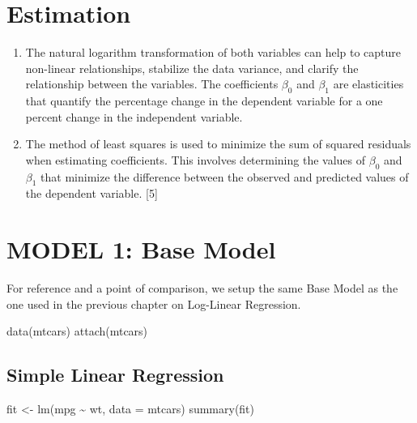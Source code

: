 \documentclass[
  letterpaper,
  DIV=11,
  numbers=noendperiod]{scrreport}
\newenvironment{Shaded}{\begin{snugshade}}{\end{snugshade}}
\newcommand{\AttributeTok}[1]{\textcolor[rgb]{0.40,0.45,0.13}{#1}}
\newcommand{\FunctionTok}[1]{\textcolor[rgb]{0.28,0.35,0.67}{#1}}
\newcommand{\NormalTok}[1]{\textcolor[rgb]{0.00,0.23,0.31}{#1}}
\newcommand{\OtherTok}[1]{\textcolor[rgb]{0.00,0.23,0.31}{#1}}
\newcommand{\SpecialCharTok}[1]{\textcolor[rgb]{0.37,0.37,0.37}{#1}}
\begin{document}
\section{Estimation}\label{estimation}

\begin{enumerate}
\def\labelenumi{\arabic{enumi}.}
\item
  The natural logarithm transformation of both variables can help to
  capture non-linear relationships, stabilize the data variance, and
  clarify the relationship between the variables. The coefficients
  \(β_0\) and \(β_1\) are elasticities that quantify the percentage
  change in the dependent variable for a one percent change in the
  independent variable.
\item
  The method of least squares is used to minimize the sum of squared
  residuals when estimating coefficients. This involves determining the
  values of \(β_0\) and \(β_1\) that minimize the difference between the
  observed and predicted values of the dependent variable. {[}5{]}
\end{enumerate}

\section{MODEL 1: Base Model}\label{model-1-base-model}

For reference and a point of comparison, we setup the same Base Model as
the one used in the previous chapter on Log-Linear Regression.

\begin{Shaded}
\begin{Highlighting}[]
\FunctionTok{data}\NormalTok{(mtcars)}
\FunctionTok{attach}\NormalTok{(mtcars)}
\end{Highlighting}
\end{Shaded}

\subsection{Simple Linear Regression}\label{simple-linear-regression}

\begin{Shaded}
\begin{Highlighting}[]
\NormalTok{fit }\OtherTok{\textless{}{-}} \FunctionTok{lm}\NormalTok{(mpg }\SpecialCharTok{\textasciitilde{}}\NormalTok{ wt, }\AttributeTok{data =}\NormalTok{ mtcars)}
\FunctionTok{summary}\NormalTok{(fit)}
\end{Highlighting}
\end{Shaded}
\end{document}
